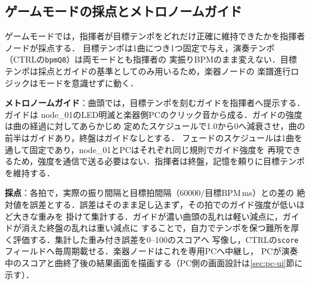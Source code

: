 \documentclass[lualatex,book,paper=a4paper,jafontsize=11.5pt,jafontscale=1.05]{jlreq}
\begin{document}
\subsection{ゲームモードの採点とメトロノームガイド}
ゲームモードでは，指揮者が目標テンポをどれだけ正確に維持できたかを指揮者ノードが採点する．
目標テンポは1曲につき1つ固定で与え，演奏テンポ（CTRLの\texttt{bpmQ8}）は両モードとも指揮者の
実振りBPMのまま変えない．目標テンポは採点とガイドの基準としてのみ用いるため，楽器ノードの
楽譜進行ロジックはモードを意識せずに動く．

\textbf{メトロノームガイド}：曲頭では，目標テンポを刻むガイドを指揮者へ提示する．ガイドは
node\_01のLED明滅と楽器側PCのクリック音から成る．ガイドの強度は曲の経過に対してあらかじめ
定めたスケジュールで1.0から0へ減衰させ，曲の前半はガイドあり，終盤はガイドなしとする．
フェードのスケジュールは1曲を通して固定であり，node\_01とPCはそれぞれ同じ規則でガイド強度を
再現できるため，強度を通信で送る必要はない．指揮者は終盤，記憶を頼りに目標テンポを維持する．

\textbf{採点}：各拍で，実際の振り間隔と目標拍間隔（$60000/\text{目標BPM}$\,ms）との差の
絶対値を誤差とする．誤差はそのまま足し込まず，その拍でのガイド強度が低いほど大きな重みを
掛けて集計する．ガイドが濃い曲頭の乱れは軽い減点に，ガイドが消えた終盤の乱れは重い減点に
することで，自力でテンポを保つ難所を厚く評価する．集計した重み付き誤差を0--100のスコアへ
写像し，CTRLの\texttt{score}フィールドへ毎周期載せる．楽器ノードはこれを専用PCへ中継し，
PCが演奏中のスコアと曲終了後の結果画面を描画する（PC側の画面設計は\ref{sec:pc-ui}節に示す）．
\end{document}
